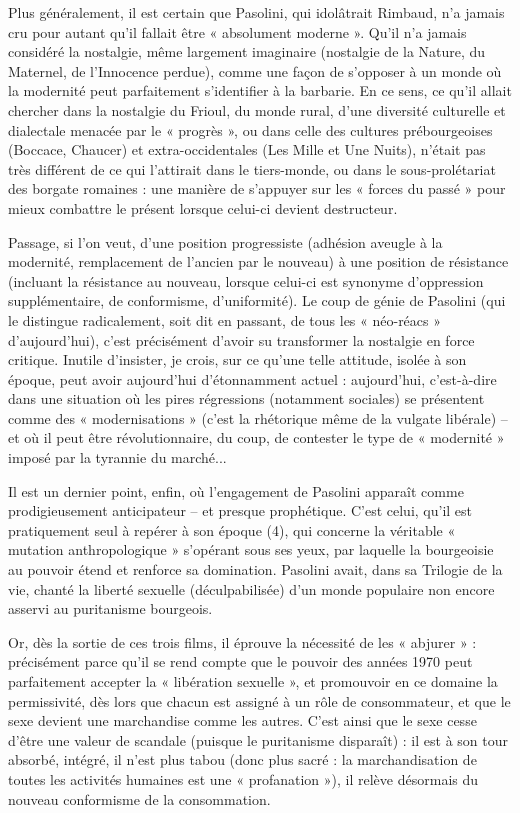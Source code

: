 \documentclass[a4paper,twocolumn]{article}
\begin{document}
Plus généralement, il est certain que Pasolini, qui idolâtrait Rimbaud, n’a jamais cru pour autant qu’il fallait être « absolument moderne ». Qu’il n’a jamais considéré la nostalgie, même largement imaginaire (nostalgie de la Nature, du Maternel, de l’Innocence perdue), comme une façon de s’opposer à un monde où la modernité peut parfaitement s’identifier à la barbarie. En ce sens, ce qu’il allait chercher dans la nostalgie du Frioul, du monde rural, d’une diversité culturelle et dialectale menacée par le « progrès », ou dans celle des cultures prébourgeoises (Boccace, Chaucer) et extra-occidentales (Les Mille et Une Nuits), n’était pas très différent de ce qui l’attirait dans le tiers-monde, ou dans le sous-prolétariat des borgate romaines : une manière de s’appuyer sur les « forces du passé » pour mieux combattre le présent lorsque celui-ci devient destructeur.

Passage, si l’on veut, d’une position progressiste (adhésion aveugle à la modernité, remplacement de l’ancien par le nouveau) à une position de résistance (incluant la résistance au nouveau, lorsque celui-ci est synonyme d’oppression supplémentaire, de conformisme, d’uniformité). Le coup de génie de Pasolini (qui le distingue radicalement, soit dit en passant, de tous les « néo-réacs » d’aujourd’hui), c’est précisément d’avoir su transformer la nostalgie en force critique. Inutile d’insister, je crois, sur ce qu’une telle attitude, isolée à son époque, peut avoir aujourd’hui d’étonnamment actuel : aujourd’hui, c’est-à-dire dans une situation où les pires régressions (notamment sociales) se présentent comme des « modernisations » (c’est la rhétorique même de la vulgate libérale) – et où il peut être révolutionnaire, du coup, de contester le type de « modernité » imposé par la tyrannie du marché...

Il est un dernier point, enfin, où l’engagement de Pasolini apparaît comme prodigieusement anticipateur – et presque prophétique. C’est celui, qu’il est pratiquement seul à repérer à son époque  (4), qui concerne la véritable « mutation anthropologique » s’opérant sous ses yeux, par laquelle la bourgeoisie au pouvoir étend et renforce sa domination. Pasolini avait, dans sa Trilogie de la vie, chanté la liberté sexuelle (déculpabilisée) d’un monde populaire non encore asservi au puritanisme bourgeois.

Or, dès la sortie de ces trois films, il éprouve la nécessité de les « abjurer » : précisément parce qu’il se rend compte que le pouvoir des années 1970 peut parfaitement accepter la « libération sexuelle », et promouvoir en ce domaine la permissivité, dès lors que chacun est assigné à un rôle de consommateur, et que le sexe devient une marchandise comme les autres. C’est ainsi que le sexe cesse d’être une valeur de scandale (puisque le puritanisme disparaît) : il est à son tour absorbé, intégré, il n’est plus tabou (donc plus sacré : la marchandisation de toutes les activités humaines est une « profanation »), il relève désormais du nouveau conformisme de la consommation.
\end{document}
